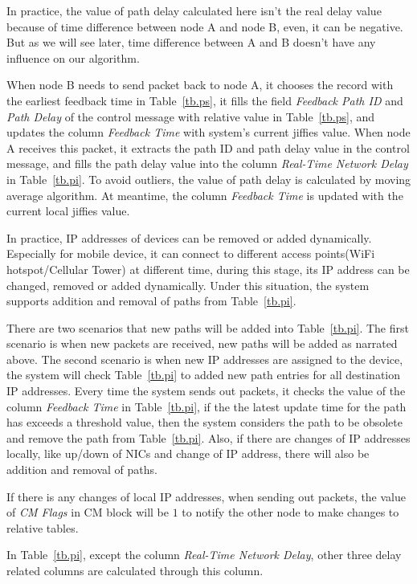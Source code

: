 In practice, the value of path delay calculated here isn't the real delay value because of time difference between node A and node B, even, it can be negative. But as we will see later, time difference between A and B doesn't have any influence on our algorithm.

When node B needs to send packet back to node A, it chooses the record with the earliest feedback time in Table~\ref{tb.ps}, it fills the field \emph{Feedback Path ID} and \emph{Path Delay} of the control message with relative value in Table~\ref{tb.ps}, and updates the column \emph{Feedback Time} with system's current jiffies value. When node A receives this packet, it extracts the path ID and path delay value in the control message, and fills the path delay value into the column \emph{Real-Time Network Delay} in Table~\ref{tb.pi}. To avoid outliers, the value of path delay is calculated by moving average algorithm. At meantime, the column \emph{Feedback Time} is updated with the current local jiffies value.

In practice, IP addresses of devices can be removed or added dynamically. Especially for mobile device, it can connect to different access points(WiFi hotspot/Cellular Tower) at different time, during this stage, its IP address can be changed, removed or added dynamically. Under this situation, the system supports addition and removal of paths from Table~\ref{tb.pi}.

There are two scenarios that new paths will be added into Table~\ref{tb.pi}. The first scenario is when new packets are received, new paths will be added as narrated above. The second scenario is when new IP addresses are assigned to the device, the system will check Table~\ref{tb.pi} to added new path entries for all destination IP addresses. Every time the system sends out packets, it checks the value of the column \emph{Feedback Time} in Table~\ref{tb.pi}, if the the latest update time for the path has exceeds a threshold value, then the system considers the path to be obsolete and remove the path from Table~\ref{tb.pi}. Also, if there are changes of IP addresses locally, like up/down of NICs and change of IP address, there will also be addition and removal of paths.

If there is any changes of local IP addresses, when sending out packets, the value of \emph{CM Flags} in CM block will be $1$ to notify the other node to make changes to relative tables.

In Table~\ref{tb.pi}, except the column \emph{Real-Time Network Delay}, other three delay related columns are calculated through this column.

